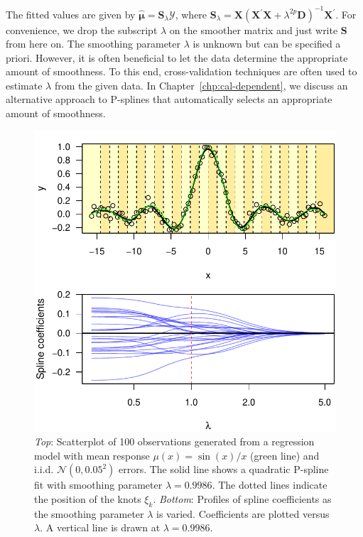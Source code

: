 \documentclass[cmfont,usenames,dvipsnames,leqno]{afit-etd}\usepackage[]{graphicx}\usepackage[]{color}
\makeatletter
\def\maxwidth{ %
  \ifdim\Gin@nat@width>\linewidth
    \linewidth
  \else
    \Gin@nat@width
  \fi
}
\newenvironment{knitrout}{}{} %
\renewenvironment{knitrout}{\begin{singlespace}}{\end{singlespace}}
\newcommand{\trans}{\ensuremath{^\prime}}
\newcommand{\bc}[1]{\ensuremath{\bm{\mathcal{#1}}}}
\newcommand{\mc}[1]{\ensuremath{\mathcal{#1}}}
\newcommand{\wh}[1]{\ensuremath{\widehat{#1}}}
\newcommand{\X}{\ensuremath{\bm{X}}}
\makeatother
\begin{document}
The fitted values are given by $\wh{\bm{\mu}} = \bm{S}_\lambda \bc{Y}$, where $\bm{S}_\lambda = \X\left( \X\trans\X + \lambda^{2p}\bm{D} \right)^{-1}\X\trans$. For convenience, we drop the subscript $\lambda$ on the smoother matrix and just write $\bm{S}$ from here on. The smoothing parameter $\lambda$ is unknown but can be specified a priori. However, it is often beneficial to let the data determine the appropriate amount of smoothness. To this end, cross-validation techniques are often used to estimate $\lambda$ from the given data. In Chapter~\ref{chp:cal-dependent}, we discuss an alternative approach to \acp{P-spline} that automatically selects an appropriate amount of smoothness.

\begin{knitrout}
\color{fgcolor}\begin{figure}[!htb]

\includegraphics[width=\maxwidth]{figure/sin-example} \caption[Unnormalized sinc function]{\textit{Top}: Scatterplot of 100 observations generated from a regression model with mean response $\mu(x) = \sin(x)/x$ (green line) and i.i.d. $\mc{N}(0, 0.05^2)$ errors. The solid line shows a quadratic \ac{P-spline} fit with smoothing parameter $\lambda = 0.9986$. The dotted lines indicate the position of the knots $\xi_k$. \textit{Bottom}: Profiles of spline coefficients as the smoothing parameter $\lambda$ is varied. Coefficients are plotted versus $\lambda$. A vertical line is drawn at $\lambda = 0.9986$.\label{fig:sin-example}}
\end{figure}


\end{knitrout}
\end{document}

